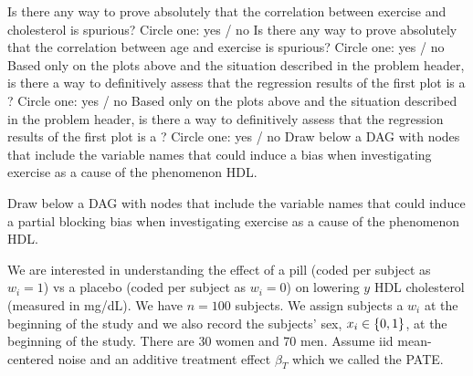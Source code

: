 \documentclass[12pt]{article}
\begin{document}
\begin{enumerate}

 Is there any way to prove absolutely that the correlation between exercise and cholesterol is spurious? Circle one: yes / no  
 Is there any way to prove absolutely that the correlation between age and exercise is spurious? Circle one: yes / no  
 Based only on the plots above and the situation described in the problem header, is there a way to definitively assess that the regression results of the first plot is a ? Circle one: yes / no  
 Based only on the plots above and the situation described in the problem header, is there a way to definitively assess that the regression results of the first plot is a ? Circle one: yes / no  
 Draw below a DAG with nodes that include the variable names that could induce a  bias when investigating exercise as a cause of the phenomenon HDL.  

 Draw below a DAG with nodes that include the variable names that could induce a partial blocking bias when investigating exercise as a cause of the phenomenon HDL.   


\end{enumerate}


\problem We are interested in understanding the effect of a pill (coded per subject as $w_i=1$) vs a placebo (coded per subject as $w_i=0$) on lowering $y$ HDL cholesterol (measured in mg/dL). We have $n=100$ subjects. We assign subjects a $w_i$ at the beginning of the study and we also record the subjects' sex, $x_i \in \left\{0,1\right\}$, at the beginning of the study. There are 30 women and 70 men. Assume iid mean-centered noise and an additive treatment effect $\beta_T$ which we called the PATE.
\end{document}

